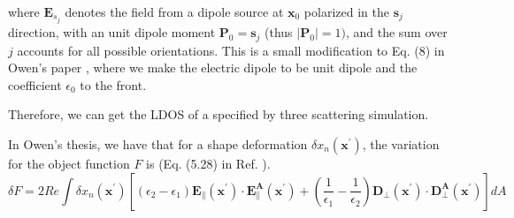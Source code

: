 \documentclass[12pt]{article}
\begin{document}
where $\mathbf{E}_{s_ j}$ denotes the field from a dipole source at $\mathbf{x}_0$ polarized in the $\mathbf{s}_j$ direction, with an unit dipole moment $\mathbf{P}_0=\mathbf{s}_j$ (thus $|\mathbf{P}_0|=1)$, and the sum over $j$ accounts for all possible orientations. This is a small modification to Eq. (8) in Owen's paper \cite{main}, where we make the electric dipole to be unit dipole and the coefficient $\epsilon_0$ to the front. 

Therefore, we can get the LDOS of a specified by three scattering simulation. %


In Owen's thesis, we have that for a shape deformation $\delta x_n(\mathbf{x}^\prime)$, the variation for the object function $F$ is (Eq. (5.28) in Ref. \cite{thesis}). 
\begin{equation}
\delta F = 2Re\int \delta x_n(\mathbf{x}^\prime) [(\epsilon_2 -\epsilon_1) \mathbf{E}_{\parallel}(\mathbf{x}^\prime)\cdot\mathbf{E}^\mathbf{A}_{\parallel}(\mathbf{x}^\prime) + (\frac{1}{\epsilon_1}-\frac{1}{\epsilon_2})\mathbf{D}_{\perp}(\mathbf{x}^\prime)\cdot\mathbf{D}^\mathbf{A}_{\perp}(\mathbf{x}^\prime)]dA\label{dF}
\end{equation}
%
\end{document}

